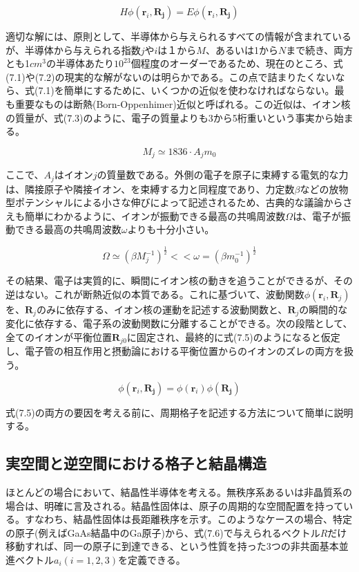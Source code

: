 \documentclass[11pt,a4j,uplatex]{jsarticle}
\begin{document}
\begin{equation}
  H\phi(\bm{r}_i,\bm{R_j})=E\phi(\bm{r}_i,\bm{R_j})\tag{7.2}
\end{equation}

適切な解には、原則として、半導体から与えられるすべての情報が含まれているが、半導体から与えられる指数$j$や$i$は１から$M$、あるいは1から$N$まで続き、両方とも1$cm^3$の半導体あたり$10^{23}$個程度のオーダーであるため、現在のところ、式(7.1)や(7.2)の現実的な解がないのは明らかである。この点で詰まりたくないなら、式(7.1)を簡単にするために、いくつかの近似を使わなければならない。最も重要なものは断熱(Born-Oppenhimer)近似と呼ばれる。この近似は、イオン核の質量が、式(7.3)のように、電子の質量よりも3から5桁重いという事実から始まる。

\begin{equation}
  M_j\simeq1836\cdot A_jm_0\tag{7.3}
\end{equation}

ここで、$A_j$はイオン$j$の質量数である。外側の電子を原子に束縛する電気的な力は、隣接原子や隣接イオン、を束縛する力と同程度であり、力定数$\beta$などの放物型ポテンシャルによる小さな伸びによって記述されるため、古典的な議論からさえも簡単にわかるように、イオンが振動できる最高の共鳴周波数$\Omega$は、電子が振動できる最高の共鳴周波数$\omega$よりも十分小さい。

\begin{equation}
  \Omega\simeq(\beta M_j^{-1})^{\frac{1}{2}}<<\omega=(\beta m_0^{-1})^{\frac{1}{2}}\tag{7.4}
\end{equation}

その結果、電子は実質的に、瞬間にイオン核の動きを追うことができるが、その逆はない。これが断熱近似の本質である。これに基づいて、波動関数$\phi(\bm{r}_i,\bm{R}_j)$を、$\bm{R}_j$のみに依存する、イオン核の運動を記述する波動関数と、$\bm{R}_j$の瞬間的な変化に依存する、電子系の波動関数に分離することができる。次の段階として、全てのイオンが平衡位置$\bm{R}_{j0}$に固定され、最終的に式(7.5)のようになると仮定し、電子管の相互作用と摂動論における平衡位置からのイオンのズレの両方を扱う。

\begin{equation}
  \phi(\bm{r}_i,\bm{R_j})=\phi(\bm{r}_i)\phi(\bm{R_j})\tag{7.5}
\end{equation}

式(7.5)の両方の要因を考える前に、周期格子を記述する方法について簡単に説明する。

\subsection{実空間と逆空間における格子と結晶構造}
ほとんどの場合において、結晶性半導体を考える。無秩序系あるいは非晶質系の場合は、明確に言及される。結晶性固体は、原子の周期的な空間配置を持っている。すなわち、結晶性固体は長距離秩序を示す。このようなケースの場合、特定の原子(例えばGaAs結晶中のGa原子)から、式(7.6)で与えられるベクトル$R$だけ移動すれば、同一の原子に到達できる、という性質を持った3つの非共面基本並進ベクトル$a_i(i=1,2,3)$を定義できる。
\end{document}
